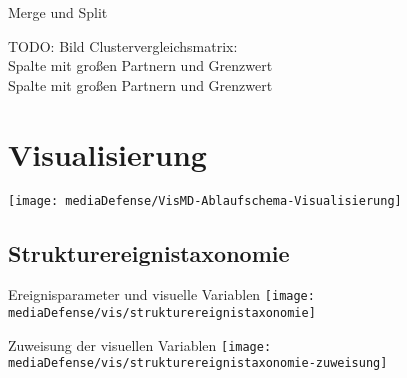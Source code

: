 \documentclass[10pt]{beamer}
\begin{document}
\begin{frame}{Merge und Split}
	
	TODO: Bild Clustervergleichsmatrix:\\
	Spalte mit großen Partnern und Grenzwert\\
	Spalte mit großen Partnern und Grenzwert
	
\end{frame}

\section{Visualisierung}
\begin{wideframe}
	\texttt{[image: mediaDefense/VisMD-Ablaufschema-Visualisierung]}
\end{wideframe}

\subsection{Strukturereignistaxonomie}

%
%
\begin{frame}{Ereignisparameter und visuelle Variablen}
	\texttt{[image: mediaDefense/vis/strukturereignistaxonomie]}
\end{frame}

%
%
\begin{frame}{Zuweisung der visuellen Variablen}
	\texttt{[image: mediaDefense/vis/strukturereignistaxonomie-zuweisung]}
\end{frame}
\end{document}
